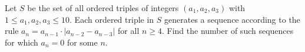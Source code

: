 Let $S$ be the set of all ordered triples of integers $(a_1,a_2,a_3)$ with $1 \le a_1,a_2,a_3 \le 10$. Each ordered triple in $S$ generates a sequence according to the rule $a_n=a_{n-1}\cdot | a_{n-2}-a_{n-3} |$ for all $n\ge 4$. Find the number of such sequences for which $a_n=0$ for some $n$.